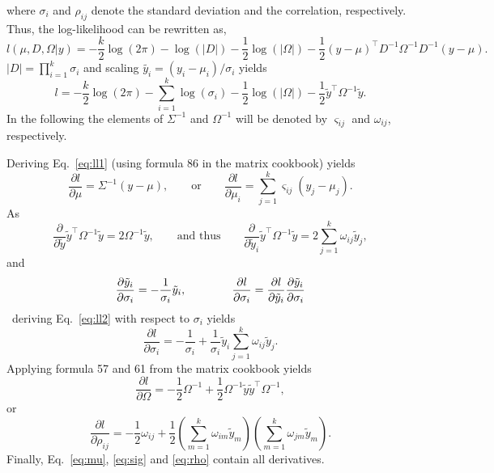 \documentclass{article}
\begin{document}
%
where $\sigma_i$ and $\rho_{ij}$ denote the standard deviation and the correlation, respectively. Thus, the log-likelihood can be rewritten as,
%
\begin{equation}
 l(\mu, D, \Omega|y) = -\frac{k}{2}\log(2\pi) - \log(|D|) - \frac{1}{2}\log(|\Omega|) - \frac{1}{2} (y-\mu)^\top D^{-1} \Omega^{-1} D^{-1} (y-\mu).
\end{equation}
%
$|D| = \prod_{i=1}^{k} \sigma_i$ and scaling $\tilde{y_i} = (y_i - \mu_i) / \sigma_i$ yields
%
\begin{equation}
 l = -\frac{k}{2}\log(2\pi) - \sum_{i=1}^{k} \log(\sigma_i) - \frac{1}{2}\log(|\Omega|) - \frac{1}{2} \tilde{y}^\top \Omega^{-1} \tilde{y}.
 \label{eq:ll2}
\end{equation}
%
In the following the elements of $\Sigma^{-1}$ and $\Omega^{-1}$ will be denoted by $\varsigma_{ij}$ and $\omega_{ij}$, respectively.

Deriving Eq.~\ref{eq:ll1} (using formula 86 in the
{matrix cookbook}) yields
%
\begin{equation}
 \frac{\partial l}{\partial \mu} = \Sigma^{-1} (y-\mu), \qquad \text{or} \qquad
 \frac{\partial l}{\partial \mu_i} = \sum_{j=1}^{k} \varsigma_{ij} (y_j - \mu_j).
 \label{eq:mu}
\end{equation}
%
As
%
\begin{equation}
 \frac{\partial}{\partial \tilde{y}} \tilde{y}^\top \Omega^{-1} \tilde{y} = 2\Omega^{-1}\tilde{y}, \qquad \text{and thus} \qquad
 \frac{\partial}{\partial \tilde{y}_i} \tilde{y}^\top \Omega^{-1} \tilde{y} = 2\sum_{j=1}^{k} \omega_{ij} \tilde{y}_j,
\end{equation}
%
and
%
\begin{equation}
 \frac{\partial \tilde{y}_i}{\partial \sigma_i} = - \frac{1}{\sigma_i} \tilde{y}_i, \qquad \text \qquad
 \frac{\partial l}{\partial \sigma_i} = \frac{\partial l}{\partial \tilde{y}_i} \frac{\partial \tilde{y}_i}{\partial \sigma_i}
\end{equation}
%
\
deriving Eq.~\ref{eq:ll2} with respect to $\sigma_i$ yields
%
\begin{equation}
 \frac{\partial l}{\partial \sigma_i} = -\frac{1}{\sigma_i} + \frac{1}{\sigma_i} \tilde{y}_i \sum_{j=1}^{k} \omega_{ij} \tilde{y}_j.
 \label{eq:sig}
\end{equation}
%
Applying formula 57 and 61 from the matrix cookbook yields
%
\begin{equation}
 \frac{\partial l}{\partial \Omega} = -\frac{1}{2} \Omega^{-1} + \frac{1}{2} \Omega^{-1} \tilde{y} \tilde{y}^\top \Omega^{-1},
\end{equation}
%
or
%
\begin{equation}
 \frac{\partial l}{\partial \rho_{ij}} = -\frac{1}{2} \omega_{ij} + \frac{1}{2} \left( \sum_{m=1}^{k} \omega_{im}\tilde{y}_m \right) \left( \sum_{m=1}^{k} \omega_{jm}\tilde{y}_m \right).
 \label{eq:rho}
\end{equation}
%
Finally, Eq.~\ref{eq:mu}, \ref{eq:sig} and \ref{eq:rho} contain all derivatives.
\end{document}

